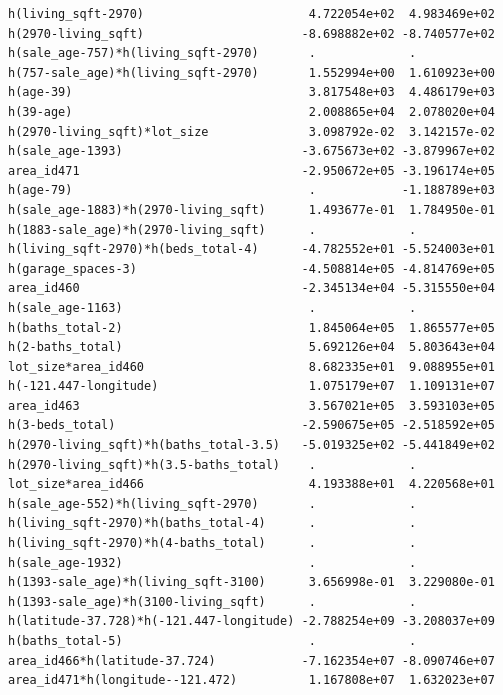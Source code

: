 \documentclass[
]{article}
\begin{document}
\begin{verbatim}
h(living_sqft-2970)                       4.722054e+02  4.983469e+02
h(2970-living_sqft)                      -8.698882e+02 -8.740577e+02
h(sale_age-757)*h(living_sqft-2970)       .             .           
h(757-sale_age)*h(living_sqft-2970)       1.552994e+00  1.610923e+00
h(age-39)                                 3.817548e+03  4.486179e+03
h(39-age)                                 2.008865e+04  2.078020e+04
h(2970-living_sqft)*lot_size              3.098792e-02  3.142157e-02
h(sale_age-1393)                         -3.675673e+02 -3.879967e+02
area_id471                               -2.950672e+05 -3.196174e+05
h(age-79)                                 .            -1.188789e+03
h(sale_age-1883)*h(2970-living_sqft)      1.493677e-01  1.784950e-01
h(1883-sale_age)*h(2970-living_sqft)      .             .           
h(living_sqft-2970)*h(beds_total-4)      -4.782552e+01 -5.524003e+01
h(garage_spaces-3)                       -4.508814e+05 -4.814769e+05
area_id460                               -2.345134e+04 -5.315550e+04
h(sale_age-1163)                          .             .           
h(baths_total-2)                          1.845064e+05  1.865577e+05
h(2-baths_total)                          5.692126e+04  5.803643e+04
lot_size*area_id460                       8.682335e+01  9.088955e+01
h(-121.447-longitude)                     1.075179e+07  1.109131e+07
area_id463                                3.567021e+05  3.593103e+05
h(3-beds_total)                          -2.590675e+05 -2.518592e+05
h(2970-living_sqft)*h(baths_total-3.5)   -5.019325e+02 -5.441849e+02
h(2970-living_sqft)*h(3.5-baths_total)    .             .           
lot_size*area_id466                       4.193388e+01  4.220568e+01
h(sale_age-552)*h(living_sqft-2970)       .             .           
h(living_sqft-2970)*h(baths_total-4)      .             .           
h(living_sqft-2970)*h(4-baths_total)      .             .           
h(sale_age-1932)                          .             .           
h(1393-sale_age)*h(living_sqft-3100)      3.656998e-01  3.229080e-01
h(1393-sale_age)*h(3100-living_sqft)      .             .           
h(latitude-37.728)*h(-121.447-longitude) -2.788254e+09 -3.208037e+09
h(baths_total-5)                          .             .           
area_id466*h(latitude-37.724)            -7.162354e+07 -8.090746e+07
area_id471*h(longitude--121.472)          1.167808e+07  1.632023e+07
                                                                    

\end{verbatim}
\end{document}
